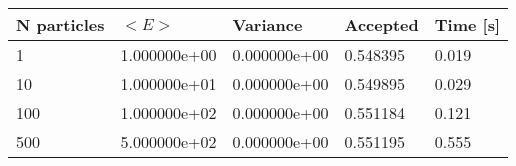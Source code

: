 \begin{table}[h!]
\centering 
\begin{tabular}{|l|l|l|l|l|}
\hline 
N particles & $<E>$ & Variance & Accepted & Time [s]\\ 
 \hline 
1 & 1.000000e+00 & 0.000000e+00 & 0.548395 & 0.019 \\ \hline 
10 & 1.000000e+01 & 0.000000e+00 & 0.549895 & 0.029 \\ \hline 
100 & 1.000000e+02 & 0.000000e+00 & 0.551184 & 0.121 \\ \hline 
500 & 5.000000e+02 & 0.000000e+00 & 0.551195 & 0.555 \\ \hline 
\end{tabular}
\label{tab:ha2} 
\end{table} 

